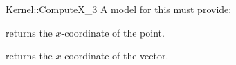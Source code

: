 \begin{ccRefFunctionObjectConcept}{Kernel::ComputeX_3}
A model for this must provide:


       {returns the $x$-coordinate of the point.}

       {returns the $x$-coordinate of the vector.}

\ccRefines
{}



\end{ccRefFunctionObjectConcept}
